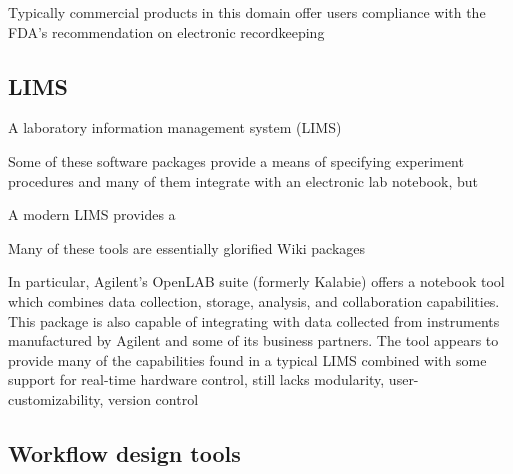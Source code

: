 \documentclass[../thesis]{subfiles}
\begin{document}
Typically commercial products in this domain offer users compliance
with the FDA's recommendation on electronic recordkeeping \cite{FDA}



\subsection{\gls{LIMS}}
A laboratory information management system (\gls{LIMS})

Some of these software packages provide a means of specifying
experiment procedures and many of them integrate with an electronic
lab notebook, but

A modern \gls{LIMS} provides a

Many of these tools are essentially glorified Wiki packages

In particular, Agilent's OpenLAB suite (formerly Kalabie) offers a
notebook tool which combines data collection, storage, analysis, and
collaboration capabilities. This package is also capable of
integrating with data collected from instruments manufactured by
Agilent and some of its business partners. The tool appears to provide
many of the capabilities found in a typical \gls{LIMS} combined with some
support for real-time hardware control,
 still lacks modularity, user-customizability, version control




\subsection{Workflow design tools}
\end{document}
